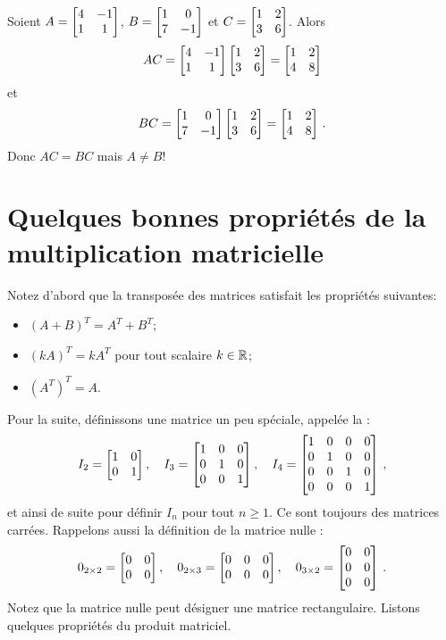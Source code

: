 
\begin{myexample}
Soient $A = \left[ \begin{matrix} 4 & -1\\ 1 & 1 \end{matrix} \right]$, $B = \left[ \begin{matrix} 1 & 0 \\ 7 & -1 \end{matrix} \right]$ et $C = \left[ \begin{matrix} 1 & 2\\ 3 & 6 \end{matrix} \right]$.  Alors
$$
AC = \left[ \begin{matrix} 4 & -1\\ 1 & 1 \end{matrix} \right]\left[ \begin{matrix} 1 & 2\\ 3 & 6 \end{matrix} \right] = \left[ \begin{matrix} 1&2\\ 4&8 \end{matrix} \right]
$$
et
$$
BC = \left[ \begin{matrix} 1 & 0 \\ 7 & -1 \end{matrix} \right]\left[ \begin{matrix} 1 & 2\\ 3 & 6 \end{matrix} \right] = \left[ \begin{matrix} 1 & 2\\ 4& 8 \end{matrix} \right]\,.
$$
Donc  $AC = BC$ mais $A \neq B$!  \end{myexample}



\section{Quelques bonnes propriétés de la multiplication matricielle}

Notez d'abord que la transpos\'ee des matrices satisfait les propri\'et\'es suivantes:
\begin{itemize}
\item $(A+B)^T = A^T + B^T$;
\item $(kA)^T = kA^T$ pour tout scalaire $k\in\mathbb{R}$;
\item $(A^T)^T = A$.\\
\end{itemize}
Pour la suite, définissons une matrice un peu spéciale, appelée la  :
$$
I_2 = \left[ \begin{matrix} 1&0\\0&1 \end{matrix} \right], \quad I_3 = \left[ \begin{matrix} 1&0&0\\0&1&0\\0&0&1 \end{matrix} \right], \quad
I_4 = \left[ \begin{matrix} 1&0&0&0\\0&1&0&0\\0&0&1&0\\0&0&0&1 \end{matrix} \right]\,,
$$
et ainsi de suite pour définir $I_n$ pour tout $n\geq1$. Ce sont toujours des matrices carrées.
Rappelons aussi la définition de la matrice nulle :
$$
0_{2\times 2} = \left[ \begin{matrix} 0&0\\0&0 \end{matrix} \right], \quad 0_{2\times3}= \left[ \begin{matrix} 0&0&0\\0&0&0 \end{matrix} \right],
\quad 0_{3\times 2} = \left[ \begin{matrix} 0&0\\0&0\\0&0 \end{matrix} \right]\,.
$$
Notez que la matrice nulle peut désigner une matrice rectangulaire.
Listons quelques propriétés du produit matriciel.  

